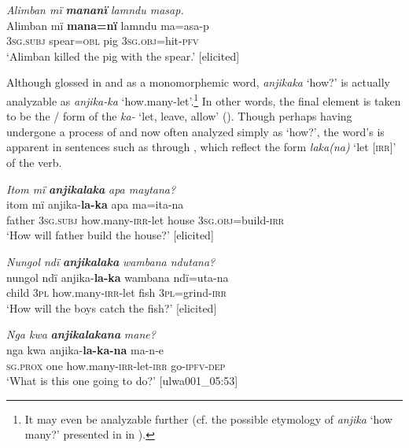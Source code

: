\ea%
    \label{ex:syntax:23}
          \textit{Alimban mï} \textbf{\textit{mananï}} \textit{lamndu masap.}\\
\gll    Alimban  mï      \textbf{mana=nï}  lamndu  ma=asa-p\\
    [name]    \textsc{3sg.subj}  spear=\textsc{obl}  pig      \textsc{3sg.obj}=hit-\textsc{pfv}\\
\glt `Alimban killed the pig with the spear.’ [elicited]
\z




Although glossed in  and  as a monomorphemic word, \textit{anjikaka} ‘how?’ is actually analyzable as \textit{anjika-ka} ‘how.many-let’.\footnote{It may even be analyzable further (cf. the possible etymology of \textit{anjika} ‘how many?’ presented in  in
).} In other words, the final element is taken to be the / form of the  \textit{ka-} ‘let, leave, allow’ (). Though perhaps having undergone a process of  and now often analyzed simply as ‘how?’, the word’s  is apparent in sentences such as  through , which reflect the  form \textit{laka(na)} ‘let [\textsc{irr}]’ of the verb.

\ea%
    \label{ex:syntax:24}
          \textit{Itom mï} \textbf{\textit{anjikalaka}} \textit{apa maytana?}\\
\gll    itom  mï      anjika-\textbf{la-ka}    apa    ma=ita-na\\
    father  3\textsc{sg.subj}  how.many-\textsc{irr}{}-let  house  \textsc{3sg.obj}=build-\textsc{irr}\\
\glt `How will father build the house?’ [elicited]
\z

\ea%
    \label{ex:syntax:25}
          \textit{Nungol ndï} \textbf{\textit{anjikalaka}} \textit{wambana ndutana?}\\
\gll    nungol  ndï  anjika-\textbf{la-ka}    wambana  ndï=uta-na\\
    child  3\textsc{pl}  how.many-\textsc{irr}{}-let  fish    3\textsc{pl}=grind-\textsc{irr}\\
\glt `How will the boys catch the fish?’ [elicited]
\z

\ea%
    \label{ex:syntax:26}
          \textit{Nga kwa} \textbf{\textit{anjikalakana}} \textit{mane?}\\
\gll    nga      kwa  anjika-\textbf{la-ka-na}      ma-n-e\\
    \textsc{sg.prox}  one    how.many-\textsc{irr}{}-let-\textsc{irr}    go-\textsc{ipfv-dep}\\
\glt `What is this one going to do?’ [ulwa001\_05:53]
\z

